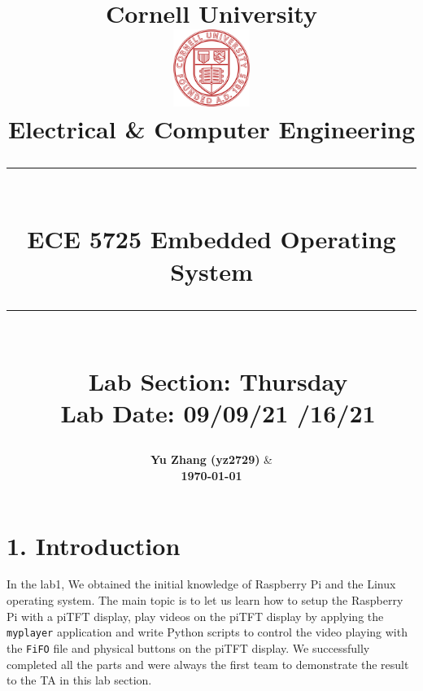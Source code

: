 \documentclass[12pt]{report}
\newcommand{\code}[1]{\colorbox{light-gray}{\texttt{#1}}}
\newcommand{\HRule}[1]{\rule{\linewidth}{#1}}
\begin{document}
\date{}

\title{ \normalsize {\textbf{Cornell University}}
		\\ [1.0cm]
		\includegraphics[width=25mm]{img/cornell_logo.png}\\[.5cm]
		Electrical & Computer Engineering \\
		\HRule{2pt} \\
		\LARGE \textbf{ ECE 5725 Embedded Operating System} \\%
		\LARGE {}
		\HRule{2pt} \\ [0.5cm]
		\normalsize \ {Lab Section: \textbf{Thursday} }\\
		\normalsize \ {Lab Date: 09/09/21 /16/21} \vspace*{5\baselineskip}\\
		}
		
\author{
		{ \textbf{Yu Zhang (yz2729)}} \quad \&  \\[5cm]
		\large {\textbf{\today} } 
		}
		

\maketitle

\section*{1. Introduction\vspace{-1em}}
In the lab1, We obtained the initial knowledge of Raspberry Pi and the Linux operating system. The main topic is to let us learn how to setup the Raspberry Pi with a piTFT display, play videos on the piTFT display by applying the \code{myplayer} application and write Python scripts to control the video playing with the \code{FiFO} file and physical buttons on the piTFT display. We successfully completed all the parts and were always the first team to demonstrate the result to the TA in this lab section.\vspace{-1em}
\end{document}

